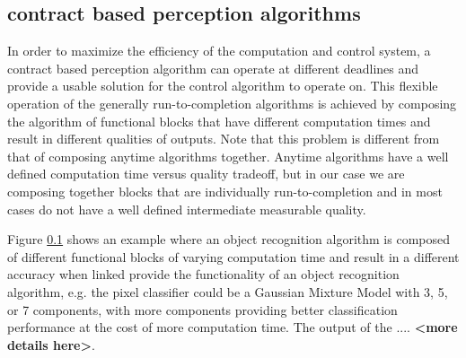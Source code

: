 \subsection{contract based perception algorithms}

In order to maximize the efficiency of the computation and control system, a contract based perception algorithm can operate at different deadlines and provide a usable solution for the control algorithm to operate on. This flexible operation of the generally run-to-completion algorithms is achieved by composing the algorithm of functional blocks that have different computation times and result in different qualities of outputs. Note that this problem is different from that of composing anytime algorithms together. Anytime algorithms have a well defined computation time versus quality tradeoff, but in our case we are composing together blocks that are individually run-to-completion and in most cases do not have a well defined intermediate measurable quality.

Figure \ref{} shows an example where an object recognition algorithm is composed of different functional blocks of varying computation time and result in a different accuracy when linked provide the functionality of an object recognition algorithm, e.g. the pixel classifier could be a Gaussian Mixture Model with 3, 5, or 7 components, with more components providing better classification performance at the cost of more computation time. The output of the .... \textbf{<more details here>}.






